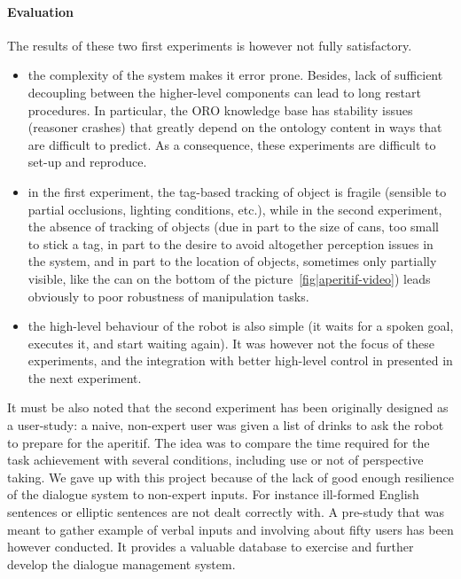 \paragraph{Evaluation} The results of these two first experiments is however
not fully satisfactory.

\begin{itemize}

    \item the complexity of the system makes it error prone. Besides, lack of
    sufficient decoupling between the higher-level components can lead to long
    restart procedures. In particular, the ORO knowledge base has stability
    issues (reasoner crashes) that greatly depend on the ontology content in
    ways that are difficult to predict. As a consequence, these experiments are
    difficult to set-up and reproduce.

    \item in the first experiment, the tag-based tracking of object is fragile
    (sensible to partial occlusions, lighting conditions, etc.), while in the
    second experiment, the absence of tracking of objects (due in part to the
    size of cans, too small to stick a tag, in part to the desire to avoid
    altogether perception issues in the system, and in part to the location of
    objects, sometimes only partially visible, like the can on the bottom of
    the picture~\ref{fig|aperitif-video}) leads obviously to poor robustness of
    manipulation tasks.

    \item the high-level behaviour of the robot is also simple (it waits for a
    spoken goal, executes it, and start waiting again). It was however not the
    focus of these experiments, and the integration with better high-level
    control in presented in the next experiment.

\end{itemize}

It must be also noted that the second experiment has been originally designed
as a user-study: a naive, non-expert user was given a list of drinks to ask the
robot to prepare for the aperitif. The idea was to compare the time required
for the task achievement with several conditions, including use or not of
perspective taking. We gave up with this project because of the lack of good
enough resilience of the dialogue system to non-expert inputs. For instance
ill-formed English sentences or elliptic sentences are not dealt correctly
with. A pre-study that was meant to gather example of verbal inputs and
involving about fifty users has been however conducted. It provides a valuable
database to exercise and further develop the dialogue management system.

